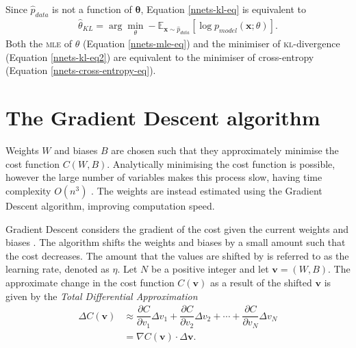 Since $\hat{p}_{data}$ is not a function of $\mathbf{\theta}$, Equation \eqref{nnets-kl-eq} is equivalent to 
\begin{align}\label{nnets-kl-eq2}
	\hat\theta_{KL} = \arg\min_\theta-\mathbb{E}_{\mathbf{x}\sim\hat{p}_{data}}\left[\log p_{model}(\mathbf{x};\theta)\right].
\end{align}
Both the \textsc{mle} of $\theta$ (Equation \eqref{nnets-mle-eq}) and the minimiser of \textsc{kl}-divergence (Equation \eqref{nnets-kl-eq2}) are equivalent to the minimiser of cross-entropy (Equation \eqref{nnets-cross-entropy-eq}). 






\section{The Gradient Descent algorithm}\label{nnets-graddesc}

Weights $W$ and biases $B$ are chosen such that they approximately minimise the cost function $C(W,B)$. Analytically minimising the cost function is possible, however the large number of variables makes this process slow, having time complexity $O(n^3)$ \citep{Marquardt1963}. The weights are instead estimated using the Gradient Descent algorithm, improving computation speed.

Gradient Descent considers the gradient of the cost given the current weights and biases \citep{Nielson2015}. The algorithm shifts the weights and biases by a small amount such that the cost decreases. The amount that the values are shifted by is referred to as the learning rate, denoted as $\eta$. Let $N$ be a positive integer and let $\mathbf{v} = (W,B)$. The approximate change in the cost function $C(\mathbf{v})$ as a result of the shifted $\mathbf{v}$ is given by the \textit{Total Differential Approximation}
\begin{align}
	\Delta C(\mathbf{v}) & \approx \dfrac{\partial C}{\partial v_1}\Delta v_1 + \dfrac{\partial C}{\partial v_2}\Delta v_2 + \cdots + \dfrac{\partial C}{\partial v_N}\Delta v_N\\
	& = \nabla C(\mathbf{v})\cdot \Delta \mathbf{v}.\label{nnets-total-diff-eq}
\end{align}


